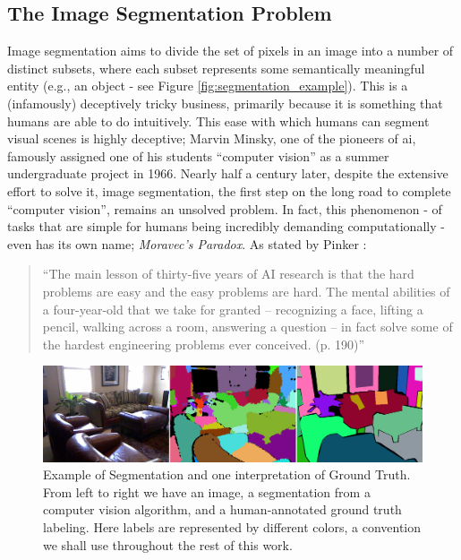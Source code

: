 \subsection{The Image Segmentation Problem}
Image segmentation aims to divide the set of pixels in an image into a number of distinct subsets, where each subset represents some semantically meaningful entity (e.g., an object - see Figure \ref{fig:segmentation_example}). This is a (infamously) deceptively tricky business, primarily because it is something that humans are able to do intuitively. This ease with which humans can segment visual scenes is highly deceptive; Marvin Minsky, one of the pioneers of \gls{ai}, famously assigned one of his students ``computer vision'' as a summer undergraduate project in 1966. Nearly half a century later, despite the extensive effort to solve it, image segmentation, the first step on the long road to complete ``computer vision'', remains an unsolved problem.  In fact, this phenomenon - of tasks that are simple for humans being incredibly demanding computationally - even has its own name; \emph{Moravec's Paradox}. As stated by Pinker \cite{Pinker_Language}:

\begin{quote}
``The main lesson of thirty-five years of AI research is that the hard problems are easy and the easy problems are hard. The mental abilities of a four-year-old that we take for granted – recognizing a face, lifting a pencil, walking across a room, answering a question – in fact solve some of the hardest engineering problems ever conceived. (p. 190)''
\end{quote}


\begin{figure}
\label{fig:SegmentationExample}
\centering
\includegraphics[width=\linewidth]{figures/Introduction/segmentation_GT_example.png}
\caption[Example of Segmentation and Ground Truth]{Example of Segmentation and one interpretation of Ground Truth. From left to right we have an image, a segmentation from a computer vision algorithm, and a human-annotated ground truth labeling. Here labels are represented by different colors, a convention we shall use throughout the rest of this work.}
\end{figure}

